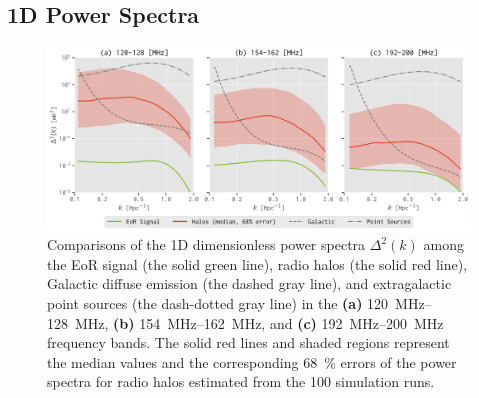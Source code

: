 \documentclass[modern]{aastex62}
\begin{document}
\subsection{1D Power Spectra}
\label{sec:ps1d}

\begin{figure}[b]
  \centering
  \includegraphics[width=\textwidth]{ps1d-3bands}
  \caption{\label{fig:ps1d-3bands}%
    Comparisons of the 1D dimensionless power spectra $\Delta^2(k)$
    among the EoR signal (the solid green line), radio halos (the solid
    red line), Galactic diffuse emission (the dashed gray line), and
    extragalactic point sources (the dash-dotted gray line) in the
    \textbf{(a)} \SIrange{120}{128}{\MHz},
    \textbf{(b)} \SIrange{154}{162}{\MHz}, and
    \textbf{(c)} \SIrange{192}{200}{\MHz} frequency bands.
    The solid red lines and shaded regions represent the median values
    and the corresponding \SI{68}{\percent} errors of the power spectra
    for radio halos estimated from the 100 simulation runs.
  }
\end{figure}
\end{document}
